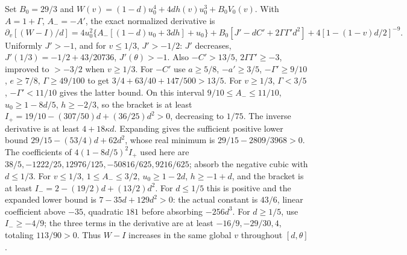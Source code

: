 Set $B_0=29/3$ and
$W(v)=(1-d)u_0^4+4dh(v)u_0^3+B_0V_0(v)$.
With $A=1+\Gamma$, $A_-=-A'$, the exact normalized derivative is
\begin{equation}\tag{L58.14.4}\label{eq:L58:middlederivative}
\partial_v[(W-I)/d]
=4u_0^2\{A_-[(1-d)u_0+3dh]+u_0\}
+B_0[J'-dC'+2\Gamma\Gamma'd^2]
+4[1-(1-v)d/2]^{-9}.
\end{equation}
Uniformly $J'>-1$, and for $v\le1/3$, $J'>-1/2$:
$J'$ decreases, $J'(1/3)=-1/2+43/20736$, $J'(\theta)>-1$.
Also $-C'>13/5$, $2\Gamma\Gamma'\ge-3$, improved to $>-3/2$
when $v\ge1/3$.
For $-C'$ use $a\ge5/8$, $-a'\ge3/5$, $-\Gamma'\ge9/10$,
$e\ge7/8$, $\Gamma\ge49/100$ to get
$3/4+63/40+147/500>13/5$.
For $v\ge1/3$, $\Gamma<3/5$, $-\Gamma'<11/10$ gives the latter bound.
On this interval $9/10\le A_-\le11/10$, $u_0\ge1-8d/5$,
$h\ge-2/3$, so the bracket is at least
$I_+=19/10-(307/50)d+(36/25)d^2>0$, decreasing to $1/75$.
The inverse derivative is at least $4+18\kappa d$.
Expanding gives the sufficient positive lower bound
$29/15-(53/4)d+62d^2$,
whose real minimum is $29/15-2809/3968>0$.
The coefficients of $4(1-8d/5)^2I_+$ used here are
$38/5,\allowbreak -1222/25,\allowbreak 12976/125,\allowbreak -50816/625,\allowbreak 9216/625$;
absorb the negative cubic with $d\le1/3$.
For $v\le1/3$, $1\le A_-\le3/2$, $u_0\ge1-2d$,
$h\ge-1+d$, and the bracket is at least
$I_-=2-(19/2)d+(13/2)d^2$.
For $d\le1/5$ this is positive and the expanded lower bound is
$7-35d+129d^2>0$: the actual constant is $43/6$, linear coefficient
above $-35$, quadratic $181$ before absorbing $-256d^3$.
For $d\ge1/5$, use $I_-\ge-4/9$; the three terms in the derivative
are at least $-16/9,-29/30,4$, totaling $113/90>0$.
Thus $W-I$ increases in the same global $v$ throughout $[d,\theta]$.

